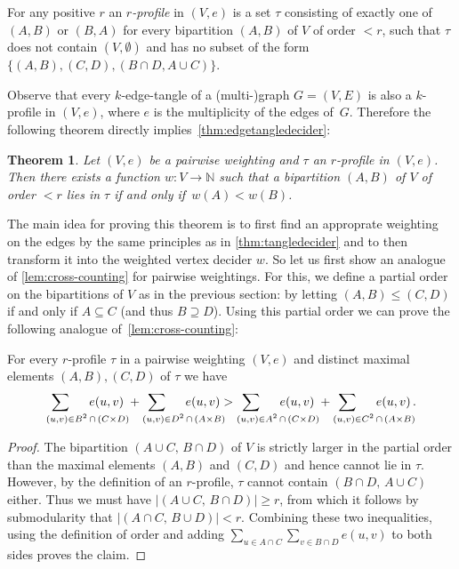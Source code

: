 \documentclass[11pt]{article}
\newtheorem{THM}{Theorem}
\theoremstyle{definition}
\newcommand{\N}{\mathbb{N}}
\newcommand{\sub}{\subseteq}
\newcommand{\abs}[1]{\left |#1\right |}
\begin{document}
For any positive $ r  $ an \emph{$ r $-profile} in $ (V, e) $ is a set $ \tau $ consisting of exactly one of $ (A, B) $ or $ (B,A) $ for every bipartition $ (A,B) $ of $ V $ of order $ < r $, such that $ \tau $ does not contain $ (V,\emptyset) $ and has no subset of the form~$ \{(A,B), (C,D), (B\cap D, A\cup C)\} $.

Observe that every $ k $-edge-tangle of a (multi-)graph $ G=(V,E) $ is also a $ k $-profile in $ (V,e) $, where $ e $ is the multiplicity of the edges of~$ G $. Therefore the following theorem directly implies~\cref{thm:edgetangledecider}:

\begin{THM}\label{thm:weighting_decider}
	Let $ (V,e) $ be a pairwise weighting and $ \tau $ an $ r $-profile in $ (V,e) $.
	Then there exists a function $ w\colon V\to\N $ such that a bipartition $ (A,B) $ of $ V $ of order $ <r $ lies in $ \tau $ if and only if~$ w(A)<w(B) $.
\end{THM}

The main idea for proving this theorem is to first find an approprate weighting on the edges by the same principles as in \cref{thm:tangledecider} and to then transform it into the weighted vertex decider $w$. So let us first show an analogue of \cref{lem:cross-counting} for pairwise weightings. For this, we define a partial order on the bipartitions of $ V $ as in the previous section: by letting $ (A,B)\le(C,D) $ if and only if $ A\sub C $ (and thus $ B\supseteq D $). Using this partial order we can prove the following analogue of~\cref{lem:cross-counting}:

\begin{LEM}\label{lem:cross-counting_edges}
	For every $ r $-profile $ \tau $ in a pairwise weighting $ (V,e) $ and distinct maximal elements $ (A,B),(C,D) $ of $ \tau $ we have
 	\[ \sum_{(u,v)\in \mathrlap{B^2\,\cap\, (C\times D)}}\quad e(u,v) \;+ \sum_{(u,v)\in \mathrlap{D^2\,\cap\, (A\times B)}}\quad e(u,v) > 	\sum_{(u,v)\in \mathrlap{A^2\,\cap\, (C\times D)}}\quad e(u,v) \; + \sum_{(u,v)\in \mathrlap{C^2\,\cap\, (A\times B)}}\quad e(u,v)\,.\]
\end{LEM}

\begin{proof}
 The bipartition $ (A\cup C,\,B\cap D)$ of $ V $ is strictly larger in the partial order than the maximal elements $ (A,B) $ and $ (C,D) $ and hence cannot lie in $ \tau $. However, by the definition of an $r$-profile, $ \tau $ cannot contain $ (B\cap D,\,A\cup C) $ either. Thus we must have $ \abs{(A\cup C,\,B\cap D)}\ge r $, from which it follows by submodularity that $ \abs{(A\cap C,\,B\cup D)}<r $. Combining these two inequalities, using the definition of order and adding $\sum_{u\in A\cap C}\sum_{v\in B\cap D}e(u,v)$ to both sides proves the claim.
\end{proof}
\end{document}
